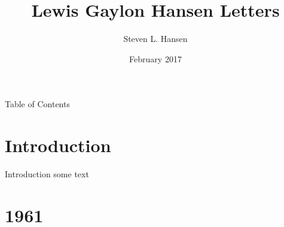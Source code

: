\documentclass{beamer}
\title[Your Short Title]{Lewis Gaylon Hansen Letters}
\author{Steven L. Hansen}
\date{February 2017}
\begin{document}
\begin{frame}
  \titlepage
\end{frame}

%
%
\begin{frame}{Table of Contents}
  \tableofcontents
\end{frame}

\section{Introduction}

\begin{frame}{Introduction}
some text
\end{frame}

\section{1961}
\end{document}
